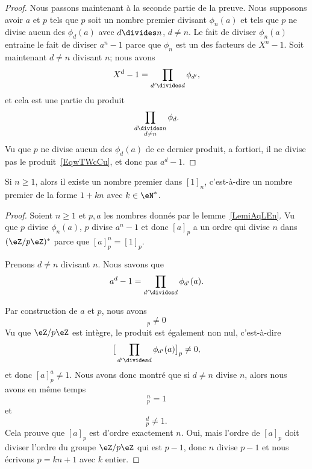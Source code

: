 \begin{proof}
    Nous passons maintenant à la seconde partie de la preuve. Nous supposons avoir \( a\) et \( p\) tels que \( p\) soit un nombre premier divisant \( \phi_n(a)\) et tels que \( p\) ne divise aucun des \( \phi_d(a)\) avec \( d\divides n\), \( d\neq n\). Le fait de diviser \( \phi_n(a)\) entraine le fait de diviser \( a^n-1\) parce que \( \phi_n\) est un des facteurs de \( X^n-1\). Soit maintenant \( d\neq n\) divisant \( n\); nous avons
    \begin{equation}    \label{EqwTWcCu}
        X^d-1=\prod_{d'\divides d}\phi_{d'},
    \end{equation}
    et cela est une partie du produit
    \begin{equation}
        \prod_{\substack{d\divides n\\d\neq n}}\phi_d.
    \end{equation}
    Vu que \( p\) ne divise aucun des \( \phi_d(a)\) de ce dernier produit, a fortiori, il ne divise pas le produit~\ref{EqwTWcCu}, et donc pas \( a^d-1\).
\end{proof}

\begin{lemma}       \label{LemrZnmpG}
    Si \( n\geq 1\), alors il existe un nombre premier dans \( [1]_n\), c'est-à-dire un nombre premier de la forme \( 1+kn\) avec \( k\in \eN^*\).
\end{lemma}

\begin{proof}
    Soient \( n\geq 1\) et \( p,a\) les nombres donnés par le lemme~\ref{LemiAqLEn}. Vu que \( p\) divise \( \phi_n(a)\), \( p\) divise \( a^n-1\) et donc \( [a]_p\) a un ordre qui divise \( n\) dans \( (\eZ/p\eZ)^*\) parce que \( [a]_p^n=[1]_p\).

    Prenons \( d\neq n\) divisant \( n\). Nous savons que
    \begin{equation}
        a^d-1=\prod_{d'\divides d}\phi_{d'}(a).
    \end{equation}

    Par construction de \( a\) et \( p\), nous avons
    \begin{equation}
        [\phi_{d'}(a)]_p\neq 0
    \end{equation}
    Vu que \( \eZ/p\eZ\) est intègre, le produit est également non nul, c'est-à-dire
    \begin{equation}
        \big[ \prod_{d'\divides d}\phi_{d'}(a) \big]_p\neq 0,
    \end{equation}
    et donc \( [a]_p^a\neq 1\). Nous avons donc montré que si \( d\neq n\) divise \( n\), alors nous avons en même temps
    \begin{equation}
        [a]_p^n=1
    \end{equation}
    et
    \begin{equation}
        [a]_p^d\neq 1.
    \end{equation}
    Cela prouve que \( [a]_p\) est d'ordre exactement \( n\). Oui, mais l'ordre de \( [a]_p\) doit diviser l'ordre du groupe \( \eZ/p\eZ\) qui est \( p-1\), donc \( n\) divise \( p-1\) et nous écrivons \( p=kn+1\) avec \( k\) entier.
\end{proof}

